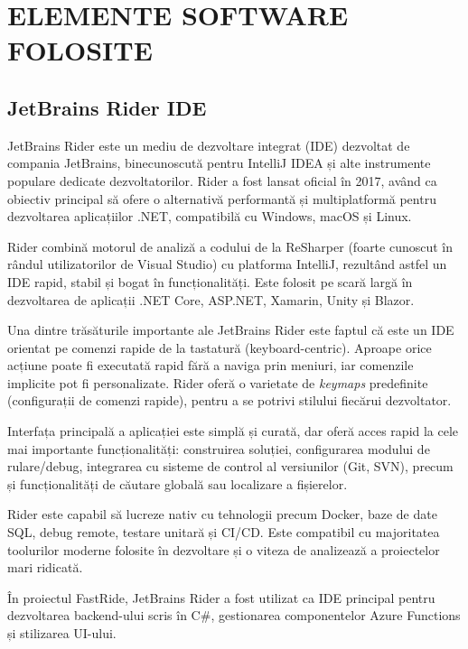 \chapter {ELEMENTE SOFTWARE FOLOSITE}
\section{JetBrains Rider IDE}

JetBrains Rider este un mediu de dezvoltare integrat (IDE) dezvoltat de compania JetBrains, binecunoscută pentru IntelliJ IDEA și alte instrumente populare dedicate dezvoltatorilor. Rider a fost lansat oficial în 2017, având ca obiectiv principal să ofere o alternativă performantă și multiplatformă pentru dezvoltarea aplicațiilor .NET, compatibilă cu Windows, macOS și Linux. \parencite{rider}

Rider combină motorul de analiză a codului de la ReSharper (foarte cunoscut în rândul utilizatorilor de Visual Studio) cu platforma IntelliJ, rezultând astfel un IDE rapid, stabil și bogat în funcționalități. Este folosit pe scară largă în dezvoltarea de aplicații .NET Core, ASP.NET, Xamarin, Unity și Blazor. \parencite{rider}

Una dintre trăsăturile importante ale JetBrains Rider este faptul că este un IDE orientat pe comenzi rapide de la tastatură (keyboard-centric). Aproape orice acțiune poate fi executată rapid fără a naviga prin meniuri, iar comenzile implicite pot fi personalizate. Rider oferă o varietate de \textit{keymaps} predefinite (configurații de comenzi rapide), pentru a se potrivi stilului fiecărui dezvoltator. \parencite{rider}

Interfața principală a aplicației este simplă și curată, dar oferă acces rapid la cele mai importante funcționalități: construirea soluției, configurarea modului de rulare/debug, integrarea cu sisteme de control al versiunilor (Git, SVN), precum și funcționalități de căutare globală sau localizare a fișierelor. \parencite{rider}

Rider este capabil să lucreze nativ cu tehnologii precum Docker, baze de date SQL, debug remote, testare unitară și CI/CD. Este compatibil cu majoritatea toolurilor moderne folosite în dezvoltare și o viteza de analizează a proiectelor mari ridicată. \parencite{rider}

În proiectul FastRide, JetBrains Rider a fost utilizat ca IDE principal pentru dezvoltarea backend-ului scris în C\#, gestionarea componentelor Azure Functions și stilizarea UI-ului.


